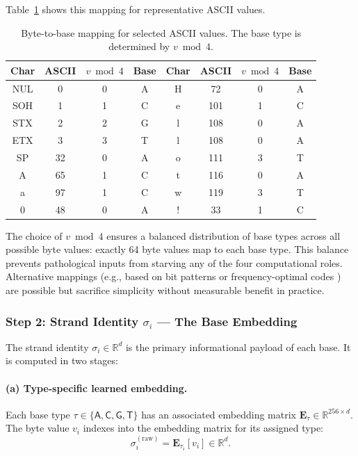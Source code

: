 Table~\ref{tab:byte-base-mapping} shows this mapping for representative ASCII values.

\begin{table}[H]
\centering
\caption{Byte-to-base mapping for selected ASCII values. The base type is determined by $v \bmod 4$.}
\label{tab:byte-base-mapping}
\renewcommand{\arraystretch}{1.1}
\footnotesize
\begin{tabular}{cccc|cccc}
\toprule
\textbf{Char} & \textbf{ASCII} & $v \bmod 4$ & \textbf{Base} & \textbf{Char} & \textbf{ASCII} & $v \bmod 4$ & \textbf{Base} \\
\midrule
NUL & 0   & 0 & A & H & 72  & 0 & A \\
SOH & 1   & 1 & C & e & 101 & 1 & C \\
STX & 2   & 2 & G & l & 108 & 0 & A \\
ETX & 3   & 3 & T & l & 108 & 0 & A \\
SP  & 32  & 0 & A & o & 111 & 3 & T \\
A   & 65  & 1 & C & t & 116 & 0 & A \\
a   & 97  & 1 & C & w & 119 & 3 & T \\
0   & 48  & 0 & A & ! & 33  & 1 & C \\
\bottomrule
\end{tabular}
\end{table}

\begin{implnote}
The choice of $v \bmod 4$ ensures a balanced distribution of base types across all possible byte values: exactly 64 byte values map to each base type. This balance prevents pathological inputs from starving any of the four computational roles. Alternative mappings (e.g., based on bit patterns or frequency-optimal codes \citep{church2012}) are possible but sacrifice simplicity without measurable benefit in practice.
\end{implnote}

\subsubsection{Step 2: Strand Identity $\sigma_i$ --- The Base Embedding}

The strand identity $\sigma_i \in \mathbb{R}^d$ is the primary informational payload of each base. It is computed in two stages:

\paragraph{(a) Type-specific learned embedding.} Each base type $\tau \in \{\mathsf{A}, \mathsf{C}, \mathsf{G}, \mathsf{T}\}$ has an associated embedding matrix $\mathbf{E}_\tau \in \mathbb{R}^{256 \times d}$. The byte value $v_i$ indexes into the embedding matrix for its assigned type:
\begin{equation}
\sigma_i^{(\text{raw})} = \mathbf{E}_{\tau_i}[v_i] \in \mathbb{R}^d.
\label{eq:sigma-raw}
\end{equation}

